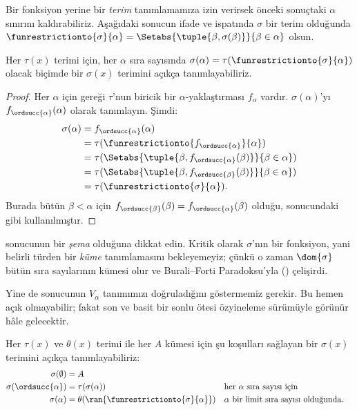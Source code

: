 \documentclass[../../../include/open-logic-section]{subfiles}
\begin{document}
Bir fonksiyon yerine bir \emph{terim} tanımlamamıza izin verirsek önceki
sonuçtaki $\alpha$ sınırını kaldırabiliriz. Aşağıdaki sonucun ifade ve
ispatında $\sigma$ bir terim olduğunda
$\funrestrictionto{\sigma}{\alpha}=
\Setabs{\tuple{\beta,\sigma(\beta)}}{\beta\in\alpha}$ olsun.

\begin{thm}
Her $\tau(x)$ terimi için, her $\alpha$ sıra sayısında
$\sigma(\alpha)=\tau(\funrestrictionto{\sigma}{\alpha})$ olacak biçimde
bir $\sigma(x)$ terimini açıkça tanımlayabiliriz.
\end{thm}

\begin{proof}
Her $\alpha$ için  gereği $\tau$'nun biricik bir
$\alpha$-yaklaştırması $f_\alpha$ vardır. $\sigma(\alpha)$'yı
$f_{\ordsucc{\alpha}}(\alpha)$ olarak tanımlayın. Şimdi:
	\begin{align*}
		\sigma(\alpha) &=
		f_{\ordsucc{\alpha}}(\alpha) \\&=
		\tau(\funrestrictionto{f_{\ordsucc{\alpha}}}{\alpha}) \\&=
		\tau(\Setabs{\tuple{\beta, f_{\ordsucc{\alpha}}(\beta)}}{\beta \in \alpha}) \\&=
		\tau(\Setabs{\tuple{\beta, f_{\ordsucc{\beta}}(\beta)}}{\beta \in \alpha})\\&=
		\tau(\funrestrictionto{\sigma}{\alpha}).
	\end{align*}
Burada bütün $\beta<\alpha$ için
$f_{\ordsucc{\beta}}(\beta)=f_{\ordsucc{\alpha}}(\beta)$ olduğu,
 sonucundaki gibi kullanılmıştır.
\end{proof}
\noindent
{} sonucunun bir \emph{şema} olduğuna dikkat
edin. Kritik olarak $\sigma$'nın bir fonksiyon, yani belirli türden bir
\emph{küme} tanımlamasını bekleyemeyiz; çünkü o zaman $\dom{\sigma}$ bütün
sıra sayılarının kümesi olur ve Burali--Forti Paradoksu'yla
() çelişirdi.

Yine de  sonucunun $V_\alpha$ tanımımızı
doğruladığını göstermemiz gerekir. Bu hemen açık olmayabilir; fakat son ve
basit bir sonlu ötesi özyineleme sürümüyle görünür hâle gelecektir.

\begin{thm}
Her $\tau(x)$ ve $\theta(x)$ terimi ile her $A$ kümesi için şu koşulları
sağlayan bir $\sigma(x)$ terimini açıkça tanımlayabiliriz:
\begin{align*}
	\sigma(\emptyset) &= A\\
	\sigma(\ordsucc{\alpha}) &= \tau(\sigma(\alpha)) &&
		\text{her $\alpha$ sıra sayısı için}\\
	\sigma(\alpha) &= \theta(\ran{\funrestrictionto{\sigma}{\alpha}})&&
	\text{$\alpha$ bir limit sıra sayısı olduğunda.}
\end{align*}
\end{thm}
\end{document}

